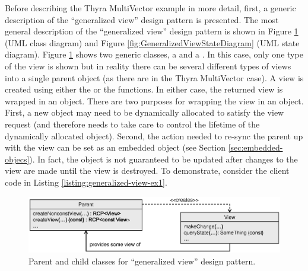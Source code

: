 \documentclass[pdf,ps2pdf,11pt]{SANDreport}
\begin{document}
Before describing the Thyra MultiVector example in more detail, first,
a generic description of the ``generalized view'' design pattern is
presented.  The most general description of the ``generalized view''
design pattern is shown in Figure
{}\ref{fig:GeneralizedViewClassDiagram} (UML class diagram) and Figure
{}\ref{fig:GeneralizedViewStateDiagram} (UML state diagram).  Figure
{}\ref{fig:GeneralizedViewClassDiagram} shows two generic classes, a
{} and a {}.  In this case, only one type of
the view is shown but in reality there can be several different types
of views into a single parent object (as there are in the Thyra
MultiVector case).  A view is created using either the
{} or the {} 
functions.  In either case, the returned view is wrapped in an
{} object.  There are two purposes for wrapping the view in
an {} object.  First, a new {} object may need to
be dynamically allocated to satisfy the view request (and therefore
needs {} to take care to control the lifetime of the
dynamically allocated object).  Second, the action needed to re-sync
the parent up with the view can be set as an embedded object (see
Section {}\ref{sec:embedded-objecs}).  In fact, the {}
object is not guaranteed to be updated after changes to the view are
made until the view is destroyed.  To demonstrate, consider the client
code in Listing {}\ref{listing:generalized-view-ex1}.


{\bsinglespace
\begin{figure}[p]
\begin{center}
\includegraphics*[angle=0,scale=0.65]{GeneralizedViewClassDiagram}
\end{center}
\caption{
\label{fig:GeneralizedViewClassDiagram}
Parent and child classes for ``generalized view'' design pattern.}
\end{figure}
\esinglespace}
\end{document}
